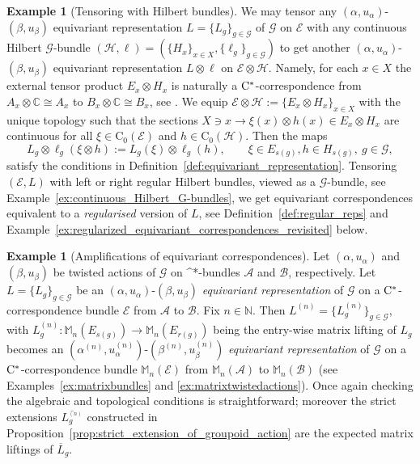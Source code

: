 \documentclass[11 pt, leqno]{amsart}
\numberwithin{equation}{section}
\theoremstyle{plain}
\theoremstyle{definition}
\newtheorem{ex}[thm]{Example}
\newcommand{\Mat}{\mathbb M} %
\newcommand*{\contz}{\mathrm{C_0}}%
\renewcommand{\H}{\mathcal H}
\newcommand{\B}{\mathcal B}
\newcommand{\G}{\mathcal G} %
\newcommand{\EE}{\mathcal E}
\newcommand{\A}{\mathcal A}
\newcommand{\C}{\mathbb C}
\newcommand{\N}{\mathbb N}
\newcommand{\cst}{\ifmmode\mathrm{C}^*\else{$\mathrm{C}^*$}\fi}
\newcommand*{\bcomment}[1]{{\color{blue}#1}}
\begin{document}
\begin{ex}[Tensoring with Hilbert bundles]\label{ex:TensorActionHilbertBundle}
We may tensor any $(\alpha,u_{\alpha})$-$(\beta,u_{\beta})$ equivariant representation $L=\{L_g\}_{g\in \G}$  of $\G$ on $\EE$ with any continuous Hilbert $\G$-bundle $(\H,\ell)=(\{H_x\}_{x\in X}, \{\ell_g\}_{g\in \G})$ to get another $(\alpha,u_{\alpha})$-$(\beta,u_{\beta})$ equivariant representation $L\otimes \ell$  on $\EE\otimes \H$. 
Namely, for each $x\in X$ the external tensor product $E_x\otimes H_x$ is naturally a $\cst$-correspondence from $A_x\otimes \C\cong A_x$ to $B_x\otimes \C\cong B_x$, see \cite{Lance}. 
We equip $\EE\otimes \H:=\{E_x\otimes H_x\}_{x\in X}$ with the unique topology such that the sections $X\ni x\to \xi(x)\otimes h(x)\in E_x\otimes H_x$ are continuous for all $\xi\in \contz(\EE)$ and $h\in \contz(\H)$. 
Then the maps 
\[
    L_{g}\otimes \ell_g (\xi\otimes h):= L_{g}(\xi)\otimes \ell_g (h), \qquad \xi \in E_{s(g)}, h\in H_{s(g)},\ g \in \G,
\]
satisfy the conditions in Definition~\ref{def:equivariant_representation}.  
Tensoring $(\EE,L)$  with left or right regular Hilbert bundles, viewed as a $\G$-bundle, see Example~\ref{ex:continuous_Hilbert_G-bundles}, we get equivariant correspondences
equivalent to a \emph{regularised} version of $L$, see Definition~\ref{def:regular_reps} and Example~\ref{ex:regularized_equivariant_correspondences_revisited} below.
%
\end{ex}

\begin{ex}[Amplifications of equivariant correspondences]\label{ex:matrixreps} 
Let $(\alpha, u_{\alpha})$ and $(\beta,u_{\beta})$ be twisted actions of $\G$ on \cst-bundles $\A$ and $\B$, respectively. 
Let $L=\{L_g\}_{g\in \G}$ be an $(\alpha, u_{\alpha})$-$(\beta,u_{\beta})$ \emph{equivariant representation} of $\G$ on a $\cst$-correspondence bundle $\EE$   from $\A$ to $\B$. 
Fix $n \in \N$. 
Then $L^{(n)}= \{L_g^{(n)}\}_{g\in \G}$, with $L_g^{(n)}:\Mat_n(E_{s(g)}) \to \Mat_n(E_{r(g)})$ being the entry-wise matrix lifting of $L_g$ becomes an  $(\alpha^{(n)}, u_{\alpha}^{(n)})$-$(\beta^{(n)},u_{\beta}^{(n)})$ \emph{equivariant representation} of $\G$ on a $\cst$-correspondence bundle $\Mat_n(\EE)$ from $\Mat_n(\A)$ to $\Mat_n(\B)$ (see Examples~\ref{ex:matrixbundles} and \ref{ex:matrixtwistedactions}). 
Once again checking the algebraic and topological conditions is straightforward; moreover the strict extensions $\overline{L_g^{{}_{(n)}}}$ constructed in Proposition~\ref{prop:strict_extension_of_groupoid_action} are the expected matrix liftings of $\overline{L}_g$. 
\end{ex}
\end{document}

